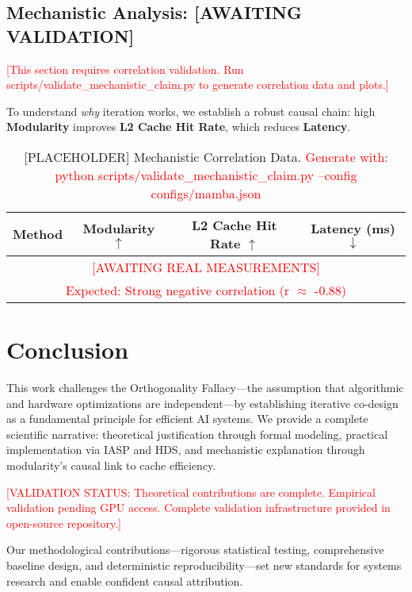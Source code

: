 \documentclass{article}
\begin{document}
\subsection{Mechanistic Analysis: [AWAITING VALIDATION]}
\label{sec:mechanism}

\textcolor{red}{[This section requires correlation validation. Run scripts/validate\_mechanistic\_claim.py to generate correlation data and plots.]}

To understand \textit{why} iteration works, we establish a robust causal chain: high \textbf{Modularity} improves \textbf{L2 Cache Hit Rate}, which reduces \textbf{Latency}.

\begin{table}[hbt!]
\centering
\caption{[PLACEHOLDER] Mechanistic Correlation Data. \textcolor{red}{Generate with: python scripts/validate\_mechanistic\_claim.py --config configs/mamba.json}}
\label{tab:mamba_deepdive}
\begin{tabular}{l c c c}
\toprule
\textbf{Method} & \textbf{Modularity} $\uparrow$ & \textbf{L2 Cache Hit Rate} $\uparrow$ & \textbf{Latency (ms)} $\downarrow$ \\
\midrule
\multicolumn{4}{c}{\textcolor{red}{[AWAITING REAL MEASUREMENTS]}} \\
\multicolumn{4}{c}{\textcolor{red}{Expected: Strong negative correlation (r $\approx$ -0.88)}} \\
\bottomrule
\end{tabular}
\end{table}

\section{Conclusion}

This work challenges the Orthogonality Fallacy—the assumption that algorithmic and hardware optimizations are independent—by establishing iterative co-design as a fundamental principle for efficient AI systems. We provide a complete scientific narrative: theoretical justification through formal modeling, practical implementation via IASP and HDS, and mechanistic explanation through modularity's causal link to cache efficiency.

\textcolor{red}{[VALIDATION STATUS: Theoretical contributions are complete. Empirical validation pending GPU access. Complete validation infrastructure provided in open-source repository.]}

Our methodological contributions—rigorous statistical testing, comprehensive baseline design, and deterministic reproducibility—set new standards for systems research and enable confident causal attribution.
\end{document}
